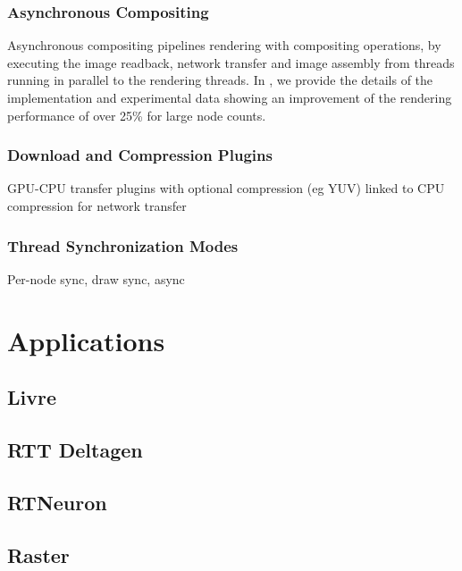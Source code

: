 \documentclass[journal]{vgtc}                %
\begin{document}
\subsubsection{Asynchronous Compositing}

Asynchronous compositing pipelines rendering with compositing operations, by
executing the image readback, network transfer and image assembly from threads
running in parallel to the rendering threads. In \cite{EBAHMP:12}, we provide
the details of the implementation and experimental data showing an improvement
of the rendering performance of over 25\% for large node counts.

\subsubsection{Download and Compression Plugins}

GPU-CPU transfer plugins with optional compression (eg YUV) linked to CPU
compression for network transfer \cite{MEP:10}

\subsubsection{Thread Synchronization Modes}\label{SEC_threading}

Per-node sync, draw sync, async

\section{Applications}

\subsection{Livre}
\subsection{RTT Deltagen}

\subsection{RTNeuron}
\cite{HBBES:13}

\subsection{Raster}
\end{document}
